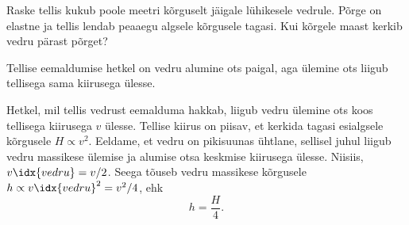 
Raske tellis kukub poole meetri kõrguselt jäigale lühikesele vedrule. Põrge
on elastne ja tellis lendab peaaegu algsele kõrgusele tagasi. Kui
kõrgele maast kerkib vedru pärast põrget?

\hint
Tellise eemaldumise hetkel on vedru alumine ots paigal, aga ülemine ots liigub tellisega sama kiirusega ülesse.

\solu
Hetkel, mil tellis vedrust eemalduma hakkab, liigub vedru ülemine ots koos tellisega kiirusega $v$ ülesse. Tellise kiirus on piisav, et kerkida tagasi esialgsele kõrgusele $H\propto v^2$. Eeldame, et vedru on pikisuunas ühtlane, sellisel juhul liigub vedru massikese ülemise ja alumise otsa keskmise kiirusega ülesse. Niisiis, $v\idx{vedru}=v/2$. Seega tõuseb vedru massikese kõrgusele $h\propto v\idx{vedru}^2=v^2/4$, ehk
\[h=\frac{H}{4}.\]
\probend
